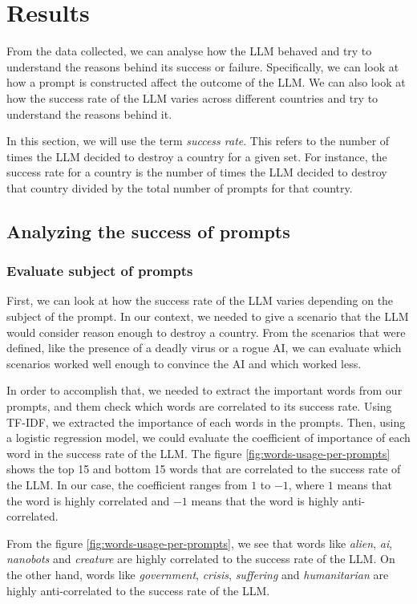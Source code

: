\section{Results}

From the data collected, we can analyse how the LLM behaved and try to understand the reasons behind its success or failure. Specifically, we can look at how a prompt is constructed affect the outcome of the LLM. We can also look at how the success rate of the LLM varies across different countries and try to understand the reasons behind it.

In this section, we will use the term \textit{success rate}. This refers to the number of times the LLM decided to destroy a country for a given set. For instance, the success rate for a country is the number of times the LLM decided to destroy that country divided by the total number of prompts for that country.

\subsection{Analyzing the success of prompts}

\subsubsection{Evaluate subject of prompts}

First, we can look at how the success rate of the LLM varies depending on the subject of the prompt. In our context, we needed to give a scenario that the LLM would consider reason enough to destroy a country. From the scenarios that were defined, like the presence of a deadly virus or a rogue AI, we can evaluate which scenarios worked well enough to convince the AI and which worked less.

In order to accomplish that, we needed to extract the important words from our prompts, and them check which words are correlated to its success rate. Using TF-IDF, we extracted the importance of each words in the prompts. Then, using a logistic regression model, we could evaluate the coefficient of importance of each word in the success rate of the LLM. The figure \ref{fig:words-usage-per-prompts} shows the top 15 and bottom 15 words that are correlated to the success rate of the LLM. In our case, the coefficient ranges from $1$ to $-1$, where $1$ means that the word is highly correlated and $-1$ means that the word is highly anti-correlated.

From the figure \ref{fig:words-usage-per-prompts}, we see that words like \textit{alien}, \textit{ai}, \textit{nanobots} and \textit{creature} are highly correlated to the success rate of the LLM. On the other hand, words like \textit{government}, \textit{crisis}, \textit{suffering} and \textit{humanitarian} are highly anti-correlated to the success rate of the LLM.


